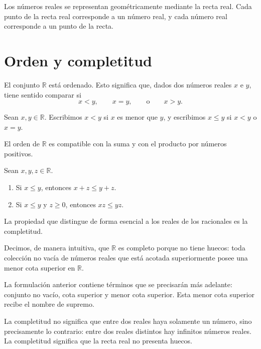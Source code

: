 Los n\'umeros reales se representan geom\'etricamente mediante la recta real. Cada punto de la recta real corresponde a un n\'umero real, y cada n\'umero real corresponde a un punto de la recta.

\section{Orden y completitud}

El conjunto \(\mathbb{R}\) est\'a ordenado. Esto significa que, dados dos n\'umeros reales \(x\) e \(y\), tiene sentido comparar si
\[
  x<y,\qquad x=y,\qquad \text{o}\qquad x>y.
\]

\begin{definicion}
Sean \(x,y\in\mathbb{R}\). Escribimos \(x<y\) si \(x\) es menor que \(y\), y escribimos \(x\leq y\) si \(x<y\) o \(x=y\).
\end{definicion}

El orden de \(\mathbb{R}\) es compatible con la suma y con el producto por n\'umeros positivos.

\begin{proposicion}
Sean \(x,y,z\in\mathbb{R}\).
\begin{enumerate}
  \item Si \(x\leq y\), entonces \(x+z\leq y+z\).
  \item Si \(x\leq y\) y \(z\geq 0\), entonces \(xz\leq yz\).
\end{enumerate}
\end{proposicion}

La propiedad que distingue de forma esencial a los reales de los racionales es la completitud.

\begin{definicion}
Decimos, de manera intuitiva, que \(\mathbb{R}\) es completo porque no tiene huecos: toda colecci\'on no vac\'ia de n\'umeros reales que est\'a acotada superiormente posee una menor cota superior en \(\mathbb{R}\).
\end{definicion}

La formulaci\'on anterior contiene t\'erminos que se precisar\'an m\'as adelante: conjunto no vac\'io, cota superior y menor cota superior. Esta menor cota superior recibe el nombre de supremo.

\begin{advertencia}
La completitud no significa que entre dos reales haya solamente un n\'umero, sino precisamente lo contrario: entre dos reales distintos hay infinitos n\'umeros reales. La completitud significa que la recta real no presenta huecos.
\end{advertencia}

